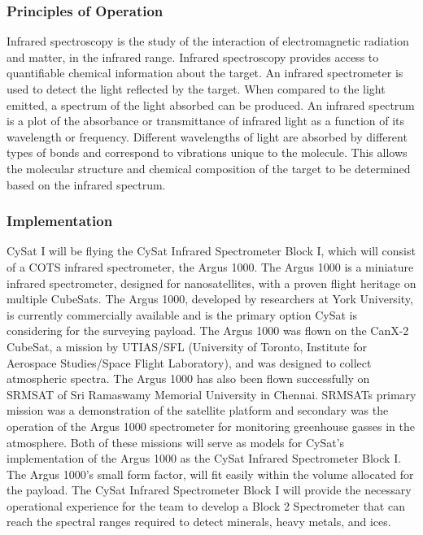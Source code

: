 \documentclass[nocover]            %
{CSLI}                       %
\begin{document}
\subsubsection{Principles of Operation}
Infrared spectroscopy is the study of the interaction of electromagnetic radiation and matter, in the infrared range. Infrared spectroscopy provides access to quantifiable chemical information about the target. An infrared spectrometer is used to detect the light reflected by the target. When compared to the light emitted, a spectrum of the light absorbed can be produced. An infrared spectrum is a plot of the absorbance or transmittance of infrared light as a function of its wavelength or frequency. Different wavelengths of light are absorbed by different types of bonds and correspond to vibrations unique to the molecule. This allows the molecular structure and chemical composition of the target to be determined based on the infrared spectrum.
\subsubsection{Implementation}
CySat I will be flying the CySat Infrared Spectrometer Block I, which will consist of a COTS infrared spectrometer, the Argus 1000. The Argus 1000 is a miniature infrared spectrometer, designed for nanosatellites, with a proven flight heritage on multiple CubeSats. The Argus 1000, developed by researchers at York University, is currently commercially available and is the primary option CySat is considering for the surveying payload. The Argus 1000 was flown on the CanX-2 CubeSat, a mission by UTIAS/SFL (University of Toronto, Institute for Aerospace Studies/Space Flight Laboratory), and was designed to collect atmospheric spectra. The Argus 1000 has also been flown successfully on SRMSAT of Sri Ramaswamy Memorial University in Chennai. SRMSATs primary mission was a demonstration of the satellite platform and secondary was the operation of the Argus 1000 spectrometer for monitoring greenhouse gasses in the atmosphere. Both of these missions will serve as models for CySat's implementation of the Argus 1000 as the CySat Infrared Spectrometer Block I. The Argus 1000's small form factor, will fit easily within the volume allocated for the payload. The CySat Infrared Spectrometer Block I will provide the necessary operational experience for the team to develop a Block 2 Spectrometer that can reach the spectral ranges required to detect minerals, heavy metals, and ices.
\end{document}
